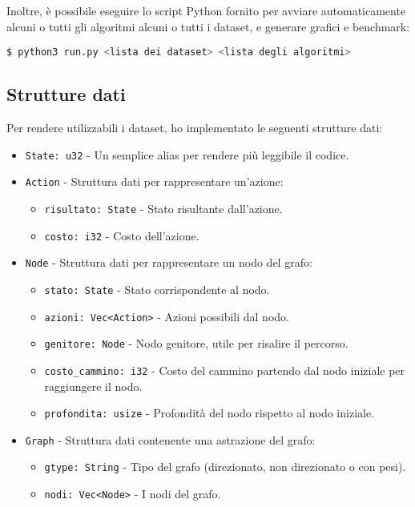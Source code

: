 \documentclass{article}
\begin{document}
Inoltre, è possibile eseguire lo script Python fornito per avviare automaticamente alcuni o tutti
gli algoritmi alcuni o tutti i dataset, e generare grafici e benchmark:

\lstinline[language=bash]|$ python3 run.py <lista dei dataset> <lista degli algoritmi>|





\newpage
\subsection{Strutture dati}
Per rendere utilizzabili i dataset, ho implementato le seguenti strutture dati:
\begin{itemize}
	\item \texttt{State: u32} - Un semplice alias per rendere più leggibile il codice.
	\item \texttt{Action} - Struttura dati per rappresentare un'azione:
	      \begin{itemize}
		      \item \texttt{risultato: State} - Stato risultante dall'azione.
		      \item \texttt{costo: i32} - Costo dell'azione.
	      \end{itemize}
	\item \texttt{Node} - Struttura dati per rappresentare un nodo del grafo:
	      \begin{itemize}
		      \item \texttt{stato: State} - Stato corrispondente al nodo.
		      \item \texttt{azioni: Vec<Action>} - Azioni possibili dal nodo.
		      \item \texttt{genitore: Node} - Nodo genitore, utile per risalire il percorso.
		      \item \texttt{costo\_cammino: i32} - Costo del cammino partendo dal nodo iniziale per raggiungere il nodo.
		      \item \texttt{profondita: usize} - Profondità del nodo rispetto al nodo iniziale.
	      \end{itemize}
	\item \texttt{Graph} - Struttura dati contenente una astrazione del grafo:
	      \begin{itemize}
		      \item \texttt{gtype: String} - Tipo del grafo (direzionato, non direzionato o con pesi).
		      \item \texttt{nodi: Vec<Node>} - I nodi del grafo.

\end{itemize}
\end{itemize}
\end{document}
